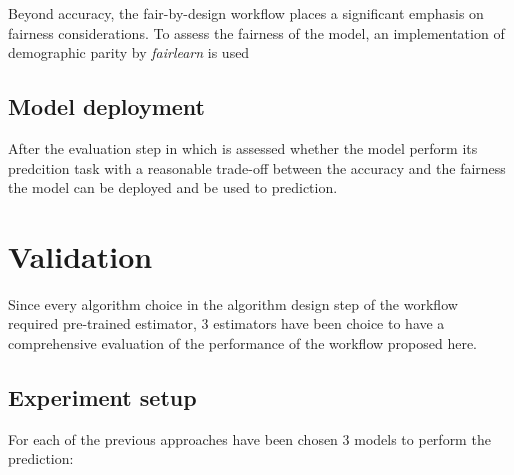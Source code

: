 \documentclass[12pt,a4paper,openright,twoside]{book}
\begin{document}
Beyond accuracy, the fair-by-design workflow places a significant emphasis on fairness considerations. To assess the fairness of the model, an implementation of demographic parity by \emph{fairlearn} is used

\section{Model deployment}
\label{section:model-deployment}

After the evaluation step in which is assessed whether the model perform its predcition task with a reasonable trade-off between the accuracy and the fairness the model can be deployed and be used to prediction.

\chapter{Validation} %
\label{chap:validation}

Since every algorithm choice in the algorithm design step of the workflow required pre-trained estimator, 3 estimators have been choice to have a comprehensive evaluation of the performance of the workflow proposed here.

\section{Experiment setup}

For each of the previous approaches have been chosen 3 models to perform the prediction:
\end{document}
